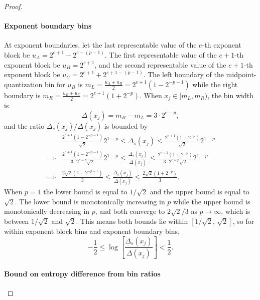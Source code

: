 \documentclass[10pt,a4paper]{amsart}
\begin{document}
\begin{proof}
\paragraph{Exponent boundary bins}

At exponent boundaries, let the last representable value of the $e$-th exponent block be $u_A = 2^{e+1} - 2^{e-(p-1)}$. The first representable value of the $e+1$-th exponent block be $u_B = 2^{e+1}$, and the second representable value of the $e+1$-th exponent block be $u_C = 2^{e+1} + 2^{e+1 - (p-1)}$. The left boundary of the midpoint-quantization bin for $u_B$ is $m_L = \frac{u_A + u_B}{2} = 2^{e+1}(1 - 2^{-p-1})$ while the right boundary is $m_R = \frac{u_B + u_C}{2} = 2^{e+1}(1+2^{-p})$. When $x_j \in [m_L, m_R)$, the bin width is
\begin{equation}\label{eq:exp_boundary}
\Delta(x_j) = m_R - m_L = 3 \cdot 2^{e-p},
\end{equation}
and the ratio $\Delta_s(x_j)/\Delta(x_j)$ is bounded by
\begin{equation}
    \begin{aligned}
    &\frac{2^{e+1}(1 - 2^{-p-1})}{\sqrt{2}}2^{1-p} \leq \Delta_s(x_j) \leq \frac{2^{e+1}(1+2^{-p})}{\sqrt{2}}2^{1-p}\\
    \implies & \frac{2^{e+1}(1 - 2^{-p-1})}{3 \cdot 2^{e-p}\sqrt{2}}2^{1-p} \leq \frac{\Delta_s(x_j)}{\Delta(x_j)} \leq \frac{2^{e+1}(1+2^{-p})}{3 \cdot 2^{e-p}\sqrt{2}}2^{1-p}\\
    \implies & \frac{2\sqrt{2}(1 - 2^{-p-1})}{3} \leq \frac{\Delta_s(x_j)}{\Delta(x_j)}  \leq \frac{2\sqrt{2}(1+2^{-p})}{3}.
    \end{aligned}
\end{equation}
When $p = 1$ the lower bound is equal to $1/\sqrt{2}$ and the upper bound is equal to $\sqrt{2}$. The lower bound is monotonically increasing in $p$ while the upper bound is monotonically decreasing in $p$, and both converge to $2\sqrt{2}/3$ as $p \rightarrow \infty$, which is between $1/\sqrt{2}$ and $\sqrt{2}$. This means both bounds lie within $[1/\sqrt{2},\, \sqrt{2}]$, so for within exponent block bins and exponent boundary bins,
\begin{equation}
    -\frac{1}{2} \leq \log\left[\frac{\Delta_s(x_j)}{\Delta(x_j)}\right] < \frac{1}{2}.
\end{equation}

\paragraph{Bound on entropy difference from bin ratios}



\end{proof}
\end{document}
